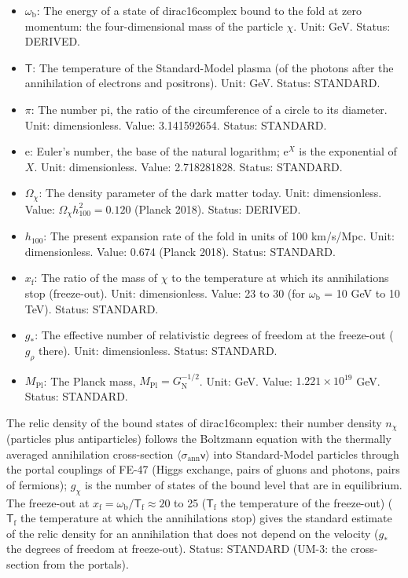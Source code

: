 \documentclass[
  10pt,
]{article}
\begin{document}
\begin{itemize}
  DERIVED.
\item
  \(\omega_{\mathrm{b}}\): The energy of a state of dirac16complex bound
  to the fold at zero momentum: the four-dimensional mass of the
  particle \(\chi\). Unit: GeV. Status: DERIVED.
\item
  \(\mathsf{T}\): The temperature of the Standard-Model plasma (of the
  photons after the annihilation of electrons and positrons). Unit: GeV.
  Status: STANDARD.
\item
  \(\pi\): The number pi, the ratio of the circumference of a circle to
  its diameter. Unit: dimensionless. Value: 3.141592654. Status:
  STANDARD.
\item
  \(\mathrm{e}\): Euler's number, the base of the natural logarithm;
  \(\mathrm{e}^{X}\) is the exponential of \(X\). Unit: dimensionless.
  Value: 2.718281828. Status: STANDARD.
\item
  \(\Omega_\chi\): The density parameter of the dark matter today. Unit:
  dimensionless. Value: \(\Omega_\chi h_{100}^2 = 0.120\) (Planck 2018).
  Status: DERIVED.
\item
  \(h_{100}\): The present expansion rate of the fold in units of 100
  km/s/Mpc. Unit: dimensionless. Value: 0.674 (Planck 2018). Status:
  STANDARD.
\item
  \(x_{\mathrm{f}}\): The ratio of the mass of \(\chi\) to the
  temperature at which its annihilations stop (freeze-out). Unit:
  dimensionless. Value: 23 to 30 (for \(\omega_{\mathrm{b}}\) = 10 GeV
  to 10 TeV). Status: STANDARD.
\item
  \(g_*\): The effective number of relativistic degrees of freedom at
  the freeze-out (\(g_\rho\) there). Unit: dimensionless. Status:
  STANDARD.
\item
  \(M_{\mathrm{Pl}}\): The Planck mass,
  \(M_{\mathrm{Pl}} = G_{\mathrm{N}}^{-1/2}\). Unit: GeV. Value:
  \(1.221\times10^{19}\) GeV. Status: STANDARD.
\end{itemize}

The relic density of the bound states of dirac16complex: their number
density \(n_\chi\) (particles plus antiparticles) follows the Boltzmann
equation with the thermally averaged annihilation cross-section
\(\langle\sigma_{\mathrm{ann}}\mathsf{v}\rangle\) into Standard-Model
particles through the portal couplings of FE-47 (Higgs exchange, pairs
of gluons and photons, pairs of fermions); \(g_\chi\) is the number of
states of the bound level that are in equilibrium. The freeze-out at
\(x_{\mathrm{f}} = \omega_{\mathrm{b}}/\mathsf{T}_{\mathrm{f}} \approx 20\)
to 25 (\(\mathsf{T}_{\mathrm{f}}\) the temperature of the freeze-out)
(\(\mathsf{T}_{\mathrm{f}}\) the temperature at which the annihilations
stop) gives the standard estimate of the relic density for an
annihilation that does not depend on the velocity (\(g_*\) the degrees
of freedom at freeze-out). Status: STANDARD (UM-3: the cross-section
from the portals).
\end{document}
